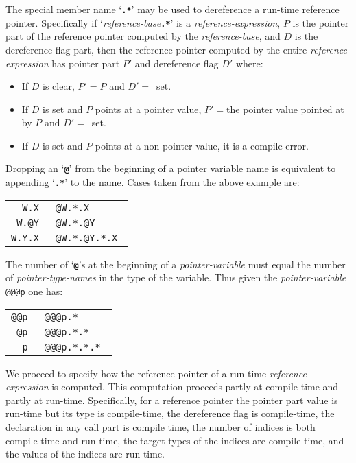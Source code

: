 \documentclass[12pt]{article}
\newcommand{\TT}[1]{{\tt \bfseries #1}}
\begin{document}
The special member name `\TT{.*}' may be used to dereference
a run-time reference pointer.  Specifically if `{\em reference-base}\TT{.*}' is
a {\em reference-expression}, $P$ is the pointer part of the
reference pointer computed by the {\em reference-base}, and $D$
is the dereference flag part, then the reference pointer computed by
the entire {\em reference-expression} has pointer part $P'$ and dereference
flag $D'$ where:
\begin{itemize}
\item If $D$ is clear,
$P'=P$ and $D'=$~set.
\item If $D$ is set and $P$ points at a pointer value,
$P'=$the pointer value pointed at by $P$ and $D'=$~set.
\item If $D$ is set and $P$ points at a non-pointer value,
it is a compile error.
\end{itemize}

Dropping an `\TT{@}' from the beginning of a pointer variable name
is equivalent to appending `\TT{.*}' to the name.  Cases taken
from the above example are:
\begin{center}
\begin{tabular}{r@{~~is equivalent to~~}l}
\tt W.X & \tt @W.*.X \\
\tt W.@Y & \tt @W.*.@Y \\
\tt W.Y.X & \tt @W.*.@Y.*.X \\
\end{tabular}
\end{center}

The number of `\TT{@}'s at the beginning of a {\em pointer-variable}
must equal the number of {\em pointer-type-names} in the type of
the variable.  Thus given the {\em pointer-variable} {\tt @@@p}
one has:
\begin{center}
\begin{tabular}{r@{~~is equivalent to~~}l}
\tt @@p & \tt @@@p.* \\
\tt @p & \tt @@@p.*.* \\
\tt p & \tt @@@p.*.*.* \\
\end{tabular}
\end{center}

We proceed to specify how the reference pointer of a run-time
{\em reference-expression} is computed.
This computation proceeds partly at compile-time and partly at
run-time.  Specifically, for a reference pointer the pointer part
value is run-time but its type is compile-time, the dereference flag
is compile-time, the declaration in any call part is compile time,
the number of indices is both compile-time and run-time, the target
types of the indices are compile-time, and the values of the indices
are run-time.
\end{document}
